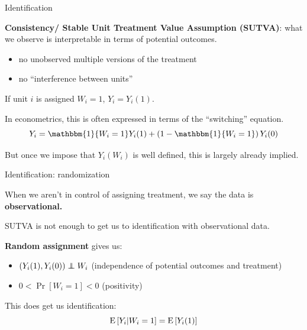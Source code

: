 \documentclass[xcolor={dvipsnames},handout]{beamer}
\begin{document}
\begin{frame}{Identification}

\begin{wideitemize}
\item \textbf{Consistency/ Stable Unit Treatment Value Assumption (SUTVA)}: what we observe is interpretable in terms of potential outcomes. \pause
\begin{itemize}
\item no unobserved multiple versions of the treatment
\item no ``interference between units''\pause
\end{itemize}
\item If unit $i$ is assigned $W_i = 1$, $Y_i = Y_i(1)$. \pause
\item In econometrics, this is often expressed in terms of the ``switching'' equation.
\[
Y_i = \mathbbm{1}\{W_i = 1 \}Y_i(1) + \left(1- \mathbbm{1}\{W_i = 1 \}\right) Y_i(0)  
\]\pause
\item But once we impose that $Y_i(W_i)$ is well defined, this is largely already implied. 
\end{wideitemize}



\end{frame}



\begin{frame}{Identification: randomization}

\begin{wideitemize}
\item When we aren't in control of assigning treatment, we say the data is \textbf{observational.}\pause
\item SUTVA is not enough to get us to identification with observational data. \pause
\item \textbf{Random assignment} gives us:  \pause
\begin{itemize}
\item $(Y_i(1), Y_i(0)) \independent W_i$ (independence of potential outcomes and treatment)
\item $0< \Pr[W_i = 1] <0$ (positivity)\pause
\end{itemize}
\item This does get us identification:
\[
{\textrm E}\,[Y_i | W_i = 1] = {\textrm E}\,[Y_i(1)]
\]
\end{wideitemize}

\end{frame}
\end{document}
